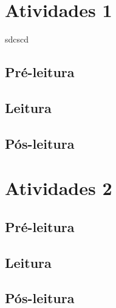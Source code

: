 \documentclass{article}
\begin{document}
\newcommand{\issnppub}{8374283428978}
\newcommand{\issnepub}{9843737537847}
\newcommand{\colaborador}{\textbf{Fulano de Tal} é uma pessoa incrível e vai fazer um bom serviço.}



\title{\titulo}
\author{\autor}
\def\authornotes{\colaborador}

\date{}
\maketitle
\tableofcontents




\section{Atividades 1}


\newenvironment{bncc}[1]{%
	\begin{tcolorbox}[colback=blue!5!white,colframe=blue!15!brown,title=#1]\footnotesize
	}{%
	\end{tcolorbox}
	}


\begin{bncc}{ssdcsd}
sdcscd
\end{bncc}


\subsection{Pré-leitura}
\subsection{Leitura}
\subsection{Pós-leitura}



\section{Atividades 2}

\subsection{Pré-leitura}
\subsection{Leitura}
\subsection{Pós-leitura}


\lipsum
\end{document}
